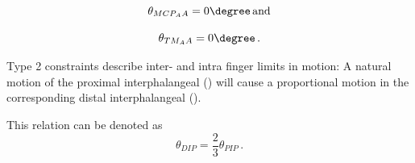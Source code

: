 	\begin{equation}
	\theta_{MCP_AA} = 0\degree\, \text{and}
	\end{equation}

	\begin{equation}
	\theta_{TM_AA} = 0\degree\,.
	\end{equation}
	
	Type 2 constraints describe inter- and intra finger limits in motion:
	A natural motion of the proximal interphalangeal () will cause a proportional motion in the corresponding distal interphalangeal ().
	
	This relation can be denoted as 
	\begin{equation}
	\theta_{DIP} = \frac{2}{3}\theta_{PIP}\,.
	\end{equation}
	



	